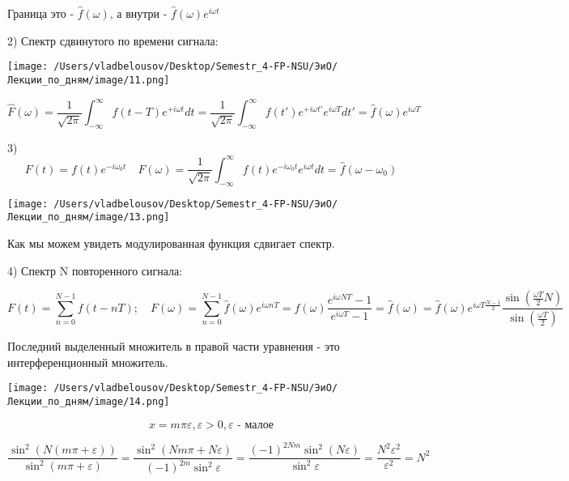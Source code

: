 \documentclass[12pt, a4paper]{report}
\begin{document}
Граница это - \( \hat{f}(\omega)   \), а внутри - \( \hat{f}(\omega) e ^{i \omega t }   \) 

2) Спектр сдвинутого по времени сигнала:

\begin{center}
    \texttt{[image: /Users/vladbelousov/Desktop/Semestr\_4-FP-NSU/ЭиО/Лекции\_по\_дням/image/11.png]}
\end{center}
\[  \hat{F}(\omega)=\frac{1}{\sqrt{2 \pi}}\int_{-\infty}^{\infty} f(t- T)e^{+ i \omega t }dt = \frac{1}{\sqrt{2\pi}} \int_{-\infty}^{\infty} f(t' )e^{+ i \omega t' } e^{i \omega T} dt ' =\hat{f}(\omega)e^{i \omega T}         \]  

3) \[  F( t)= f(t) e^{- i \omega_0 t  }\quad  F(\omega)= \frac{1}{\sqrt{2 \pi}} \int_{-\infty}^{\infty}   f(t) e ^{- i \omega_0 t} e ^{i \omega t}dt  = \hat{f}( \omega - \omega_0) \]  

\begin{center}
    \texttt{[image: /Users/vladbelousov/Desktop/Semestr\_4-FP-NSU/ЭиО/Лекции\_по\_дням/image/13.png]}
\end{center}

Как мы можем увидеть модулированная функция сдвигает спектр.

4) Спектр N повторенного сигнала: 

\[ F(t)= \sum_{n=0}^{N-1} f( t - nT); \quad F(\omega)= \sum _{n=0}^{N-1} \hat{f}(\omega) e^{i \omega n T} = f( \omega ) \frac{ e ^{i \omega NT} -1}{e ^{i \omega T} -1}  = \hat{f} ( \omega )= \hat{f}(\omega) e^{i \omega T \frac{ N-1 }{2} } \boxed{\frac{\sin \left( \frac{\omega T}{2}N  \right) }{\sin \left( \frac{\omega T}{2} \right)}}   \]

Последний выделенный  множитель в правой части уравнения - это интерференционный множитель.

\begin{center}
    \texttt{[image: /Users/vladbelousov/Desktop/Semestr\_4-FP-NSU/ЭиО/Лекции\_по\_дням/image/14.png]}
\end{center}
\[ x=  m \pi \varepsilon, \varepsilon > 0 , \varepsilon \text{ - малое}   \] 

\[ \frac{\sin ^2 (N ( m\pi+ \varepsilon))}{\sin  ^2 ( m \pi + \varepsilon )} = \frac{\sin ^2 (Nm \pi + N \varepsilon)}{(-1)^{2m}\sin ^2 \varepsilon } =\frac{(-1)^{2Nm} \sin ^2 ( N \varepsilon)}{\sin  ^2 \varepsilon} =\frac{N ^2 \varepsilon ^2}{\varepsilon ^2 } = N ^2   \] 


\ifdefined\mainfile
\else
    
\end{document}
